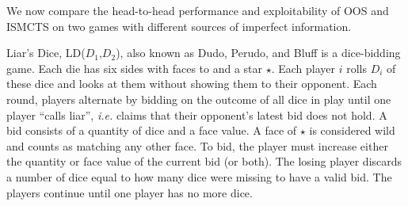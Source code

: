 \documentclass[letterpaper]{article}
\newcommand{\tth}{\mathtt{h}}
\newcommand{\ie}{{\it i.e.}\xspace}
\begin{document}
%

We now compare the head-to-head performance and exploitability 
of OOS and ISMCTS on two games with different sources of imperfect information. 

Liar's Dice, LD($D_1$,$D_2$), also known as Dudo, Perudo, and Bluff is a dice-bidding game. 
Each die has six sides with faces  to  and a star $\star$. 
Each player $i$ rolls $D_i$ of these dice and looks at them without showing them to their opponent. 
Each round, players alternate by bidding on the outcome of all dice in play until one player ``calls liar'', 
\ie claims that their opponent's latest bid does not hold.
A bid consists of a quantity of dice and a face value.  
A face of $\star$ is considered wild and counts as matching any other face.
To bid, the player must increase either the quantity or face value of the current 
bid (or both). The losing player discards a number of dice equal to how many dice were missing 
to have a valid bid. The players continue until one player has no more dice.
\end{document}
